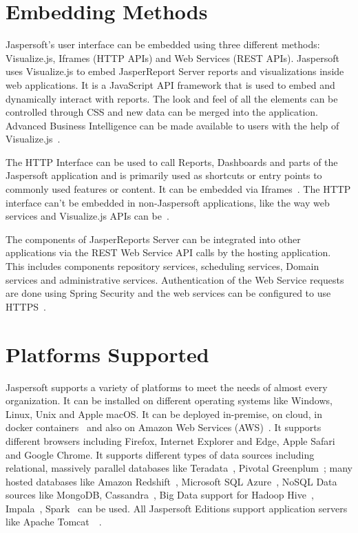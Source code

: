 \section{Embedding Methods}
Jaspersoft's user interface can be embedded using three different methods:
Visualize.js, Iframes (HTTP APIs) and Web Services (REST APIs). Jaspersoft uses
Visualize.js to embed JasperReport Server reports and visualizations inside web
applications. It is a JavaScript API framework that is used to embed and
dynamically interact with reports. The look and feel of all the elements can be
controlled through CSS and new data can be merged into the application. Advanced
Business Intelligence can be made available to users with the help of
Visualize.js~\cite{hid-sp18-516-www-jaspersoft-visualize-js}. 

The HTTP Interface can be used to call Reports, Dashboards and parts of the
Jaspersoft application and is primarily used as shortcuts or entry points to
commonly used features or content. It can be embedded via
Iframes~\cite{hid-sp18-516-www-jaspersoft-http-api1}. The HTTP interface can't
be embedded in non-Jaspersoft applications, like the way web services and
Visualize.js APIs can be~\cite{hid-sp18-516-www-jaspersoft-http-api2}.

The components of JasperReports Server can be integrated into other applications
via the REST Web Service API calls by the hosting application. This includes
components repository services, scheduling services, Domain services and
administrative services. Authentication of the Web Service requests are done
using Spring Security and the web services can be configured to use
HTTPS~\cite{hid-sp18-516-www-jaspersoft-webservices}. 

\section{Platforms Supported}
Jaspersoft supports a variety of platforms to meet the needs of almost every
organization. It can be installed on different operating systems like Windows,
Linux, Unix and Apple macOS. It can be deployed in-premise, on cloud, in docker
containers~\cite{hid-sp18-516-www-docker} and also on Amazon Web Services 
(AWS)~\cite{hid-sp18-516-www-aws}. It supports different browsers including Firefox,
Internet Explorer and Edge, Apple Safari and Google Chrome. It supports different
types of data sources including relational, massively parallel databases like
Teradata~\cite{hid-sp18-516-www-techopedia-teradata}, Pivotal
Greenplum~\cite{hid-sp18-516-www-pivotal-greenplum}; many hosted databases like
Amazon Redshift~\cite{hid-sp18-516-www-aws-redshift}, Microsoft SQL
Azure~\cite{hid-sp18-516-www-microsoft-azure}, NoSQL Data sources like MongoDB,
Cassandra~\cite{hid-sp18-516-www-wiki-cassandra}, Big Data support for Hadoop
Hive~\cite{hid-sp18-516-www-wiki-hive},
Impala~\cite{hid-sp18-516-www-wiki-impala},
Spark~\cite{hid-sp18-516-www-wiki-spark} can be used. All Jaspersoft Editions
support application servers like Apache
Tomcat~\cite{hid-sp18-516-www-wiki-tomcat}~\cite{hid-sp18-516-www-jaspersoft-quick-start}.


